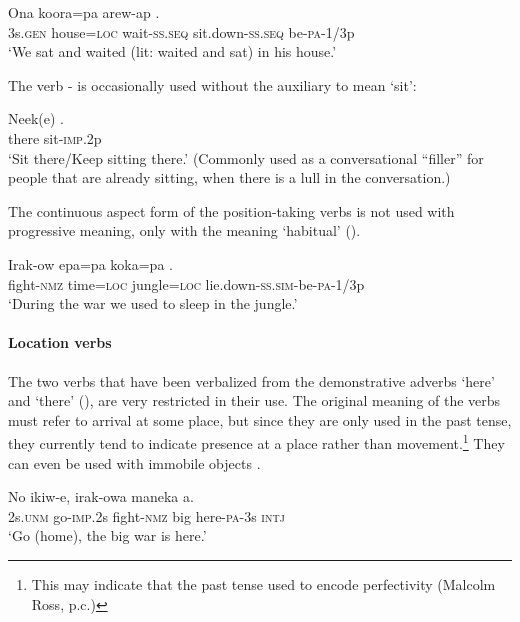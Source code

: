 \ea%
\label{ex:3:x274}
\gll Ona koora=pa arew-ap  . \\
3s.\textsc{gen} house=\textsc{loc} wait-\textsc{ss}.\textsc{seq} sit.down-\textsc{ss}.\textsc{seq} be-\textsc{pa}-1/3p\\
\glt`We sat and waited (lit: waited and sat) in his house.'
\z

The verb - is occasionally used without the auxiliary to mean `sit': 

\ea%
\label{ex:3:x1824}
\gll Neek(e) . \\
there sit-\textsc{imp}.2p\\
\glt`Sit there/Keep sitting there.' (Commonly used as a conversational ``filler'' for people that are already sitting, when there is a lull in the conversation.)
\z

The continuous aspect form of the position-taking verbs is not used with progressive meaning, only with the meaning `habitual' (). 

\ea%
\label{ex:3:x275}
\gll Irak-ow epa=pa koka=pa . \\
fight-\textsc{nmz} time=\textsc{loc} jungle=\textsc{loc} lie.down-\textsc{ss}.\textsc{sim}-be-\textsc{pa}-1/3p \\
\glt`During the war we used to sleep in the jungle.'
\z

\paragraph{Location verbs}\label{sec:3.8.4.4.3}
{}
The two verbs that have been verbalized from the demonstrative adverbs  `here' and  `there' (), are very restricted in their use. The original meaning of the verbs must refer to arrival at some place, but since they are only used in the past tense, they currently tend to indicate presence at a place rather than movement.\footnote{This may indicate that the past tense used to encode perfectivity (Malcolm Ross, p.c.)} They can even be used with immobile objects . 

\ea%
\label{ex:3:x1270}
\gll No ikiw-e, irak-owa maneka \textstyleEmphasizedVernacularWords{-}\textstyleEmphasizedVernacularWords{-} a. \\
2s.\textsc{unm} go-\textsc{imp}.2s fight-\textsc{nmz} big here-\textsc{pa}-3s \textsc{intj}\\
\glt`Go (home), the big war is here.'
\z

